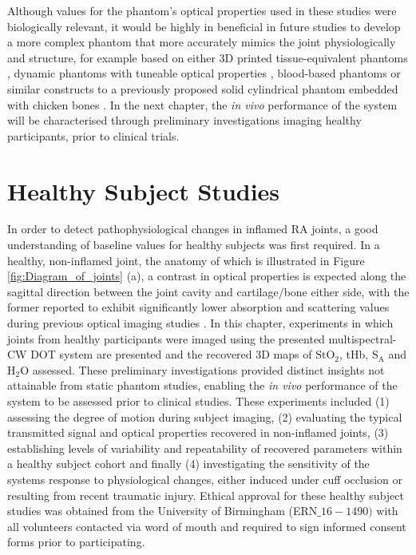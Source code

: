 \documentclass[twoside]{bhamthesis}
\theoremstyle{definition}
\begin{document}
Although values for the phantom's optical properties used in these studies were biologically relevant, it would be highly in beneficial in future studies to develop a more complex phantom that more accurately mimics the joint physiologically and structure, for example based on either 3D printed tissue-equivalent phantoms \cite{dempsey2017geometrically}, dynamic phantoms with tuneable optical properties \cite{ayers2008fabrication}, blood-based phantoms \cite{mcbride1999spectroscopic} or similar constructs to a previously proposed solid cylindrical phantom embedded with chicken bones \cite{xu2001imaging}.  In the next chapter, the \textit{in vivo} performance of the system will be characterised through preliminary investigations imaging healthy participants, prior to clinical trials.

\chapter{Healthy Subject Studies}
\label{chapter:Healthy Subject Studies}

In order to detect pathophysiological changes in inflamed RA joints, a good understanding of baseline values for healthy subjects was first required. In a healthy, non-inflamed joint, the anatomy of which is illustrated in Figure \ref{fig:Diagram_of_joints} (a), a contrast in optical properties is expected along the sagittal direction between the joint cavity and cartilage/bone either side, with the former reported to exhibit significantly lower absorption and scattering values during previous optical imaging studies \cite{montejo2013computer,yuan2007three}. In this chapter, experiments in which joints from healthy participants were imaged using the presented multispectral-CW DOT system are presented and the recovered 3D maps of $\mathrm{StO_2}$, tHb, $\mathrm{S_A}$ and $\mathrm{H_2O}$ assessed. These preliminary investigations provided distinct insights not attainable from static phantom studies, enabling the \textit{in vivo} performance of the system to be assessed prior to clinical studies. These experiments included (1) assessing the degree of motion during subject imaging, (2) evaluating the typical transmitted signal and optical properties recovered in non-inflamed joints, (3) establishing levels of variability and repeatability of recovered parameters within a healthy subject cohort and finally (4) investigating the sensitivity of the systems response to physiological changes, either induced under cuff occlusion or resulting from recent traumatic injury. Ethical approval for these healthy subject studies was obtained from the University of Birmingham (ERN$\_16-1490)$ with all volunteers contacted via word of mouth and required to sign informed consent forms prior to participating.
\end{document}
